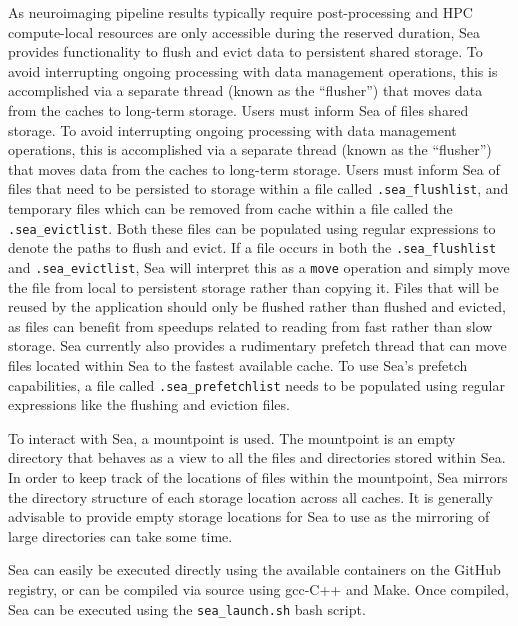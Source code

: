 \documentclass[fleqn,10pt]{wlscirep}
\begin{document}
    As neuroimaging pipeline results typically require post-processing and
    HPC compute-local resources are only accessible during the reserved
    duration, Sea provides functionality to flush and evict data to persistent
    shared storage. To avoid interrupting ongoing
    processing with data management operations, this is accomplished via a separate thread (known as the
    ``flusher'') that moves data from the caches to long-term storage. Users must inform Sea of files
    shared storage. To avoid interrupting ongoing
    processing with data management operations, this is accomplished via a separate thread (known as the
    ``flusher'') that moves data from the caches to long-term storage. Users must inform Sea of files
    that need to be persisted to storage within a file called
    \texttt{.sea\_flushlist}, and temporary files which can be removed from
    cache within a file called the \texttt{.sea\_evictlist}. Both these files
    can be populated using regular expressions to denote the paths to flush and
    evict. If a file occurs in both the \texttt{.sea\_flushlist} and
    \texttt{.sea\_evictlist}, Sea will interpret this as a \texttt{move}
    operation and simply move the file from local to persistent storage rather
    than copying it. Files that will be reused by the application should only be
    flushed rather than flushed and evicted, as files can benefit from speedups
    related to reading from fast rather than slow storage. Sea currently also
    provides a rudimentary prefetch thread that can move files located within
    Sea to the fastest available cache. To use Sea's prefetch
    capabilities, a file called \texttt{.sea\_prefetchlist} needs to be
    populated using regular expressions like the flushing and eviction files.
    
    To interact with Sea, a mountpoint is used. The mountpoint
    is an empty directory that behaves as a view to all the files and
    directories stored within Sea. In order to keep track of the locations of
    files within the mountpoint, Sea mirrors the directory structure of each
    storage location across all caches. It is generally advisable to provide
    empty storage locations for Sea to use as the mirroring of large directories
    can take some time.
    
    Sea can easily be executed directly using the available containers on the
    GitHub registry, or can be compiled via source using gcc-C++ and Make. Once
    compiled, Sea can be executed using the \texttt{sea\_launch.sh} bash script.
\end{document}
